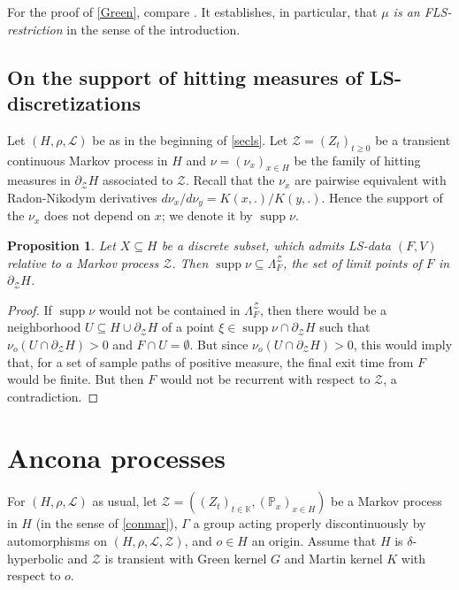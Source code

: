 \documentclass[12pt,a4paper]{amsart}
\numberwithin{equation}{section}
\newtheorem{prop}[equation]{Proposition}
\theoremstyle{definition}
\DeclareMathOperator{\supp}{supp}
\def\K{\mathbb K}
\begin{document}
For the proof of \cref{Green}, compare \cite[p.\,86-88]{BL2}.
It establishes, in particular, that \emph{$\mu$ is an FLS-restriction} in the sense of the introduction.

\subsection{On the support of hitting measures of LS-discretizations}\label{subsupp}
Let $(H,\rho,\mathcal L)$ be as in the beginning of \cref{secls}.
Let $\mathcal{Z}=(Z_t)_{t\ge0}$ be a transient continuous Markov process in $H$ and $\nu=(\nu_x)_{x\in H}$ be the family of hitting measures in $\partial_{\mathcal Z}H$ associated to $\mathcal Z$.
Recall that the $\nu_x$ are pairwise equivalent with Radon-Nikodym derivatives $d\nu_x/d\nu_y=K(x,.)/K(y,.)$.
Hence the support of the $\nu_x$ does not depend on $x$; we denote it by $\supp\nu$.

\begin{prop}\label{supp}
Let $X\subseteq H$ be a discrete subset, which admits LS-data $(F,V)$ relative to a Markov process $\mathcal Z$.
Then $\supp \nu\subseteq \Lambda_F^{\mathcal Z}$, the set of limit points of $F$ in $\partial_{\mathcal Z}H$.
\end{prop}

\begin{proof}
If $\supp\nu$ would not be contained in $\Lambda_F^{\mathcal Z}$, then there would be a neighborhood $U\subseteq H\cup\partial_{\mathcal Z}H$ of a point $\xi\in \supp\nu \cap \partial_{\mathcal Z}H$ such that $\nu_o(U\cap \partial_{\mathcal Z}H)>0$ and $F\cap U=\emptyset$.
But since $\nu_o(U\cap \partial_{\mathcal Z}H)>0$, this would imply that, for a set of sample paths of positive measure, the final exit time from $F$ would be finite.
But then $F$ would not be recurrent with respect to $\mathcal{Z}$, a contradiction. 
\end{proof}

\section{Ancona processes}\label{secancona}
For $(H,\rho,\mathcal L)$ as usual, let $\mathcal{Z}=((Z_t)_{t\in \K},(\mathbb{P}_x)_{x\in H})$ be a Markov process in $H$ (in the sense of \ref{conmar}), $\Gamma$ a group acting properly discontinuously by automorphisms on $(H,\rho,\mathcal L,\mathcal{Z})$, and $o\in H$ an origin.
Assume that $H$ is $\delta$-hyperbolic and $\mathcal Z$ is transient with Green kernel $G$ and Martin kernel $K$ with respect to $o$. 
\end{document}
